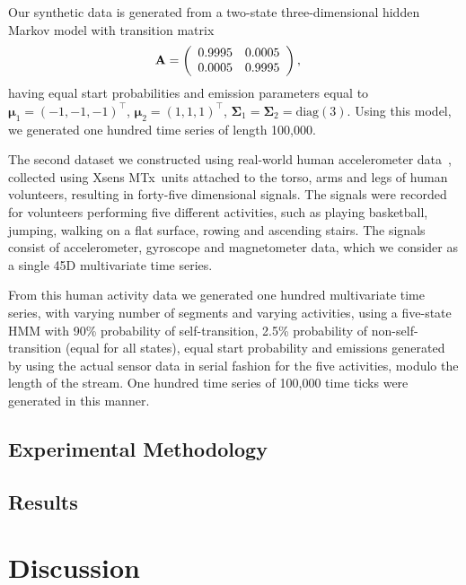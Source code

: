 \documentclass{article}
\begin{document}
Our synthetic data is generated from a two-state three-dimensional hidden Markov model with transition matrix
\begin{align*}
  \setlength{\abovedisplayskip}{0pt}
  \setlength{\belowdisplayskip}{0pt}
    \mathbf{A} &= \left( 
                   \begin{array}{ccc}
                    0.9995 & 0.0005 \\
                    0.0005 & 0.9995
                   \end{array}
                   \right),
\end{align*}
having equal start probabilities and emission parameters equal to $\mathbf{\mu}_1 = (-1, -1, -1)^\top$, $\mathbf{\mu}_2 = (1, 1, 1)^\top$, $\mathbf{\Sigma}_1 = \mathbf{\Sigma}_2 = \text{diag}(3)$. Using this model, we generated one hundred time series of length 100,000.

The second dataset we constructed using real-world human accelerometer data~\cite{Altun:2010:CSC:1823245.1823314}, collected using Xsens MTx\texttrademark\ units attached to the torso, arms and legs of human volunteers, resulting in forty-five dimensional signals. The signals were recorded for volunteers performing five different activities, such as playing basketball, jumping, walking on a flat surface, rowing and ascending stairs. The signals consist of accelerometer, gyroscope and magnetometer data, which we consider as a single 45D multivariate time series. 

From this human activity data we generated one hundred multivariate time series, with varying number of segments and varying activities, using a five-state HMM with 90\% probability of self-transition, 2.5\% probability of non-self-transition (equal for all states), equal start probability and emissions generated by using the actual sensor data in serial fashion for the five activities, modulo the length of the stream. One hundred time series of 100,000 time ticks were generated in this manner.

\subsection{Experimental Methodology}

\subsection{Results}

\section{Discussion}
\end{document}
